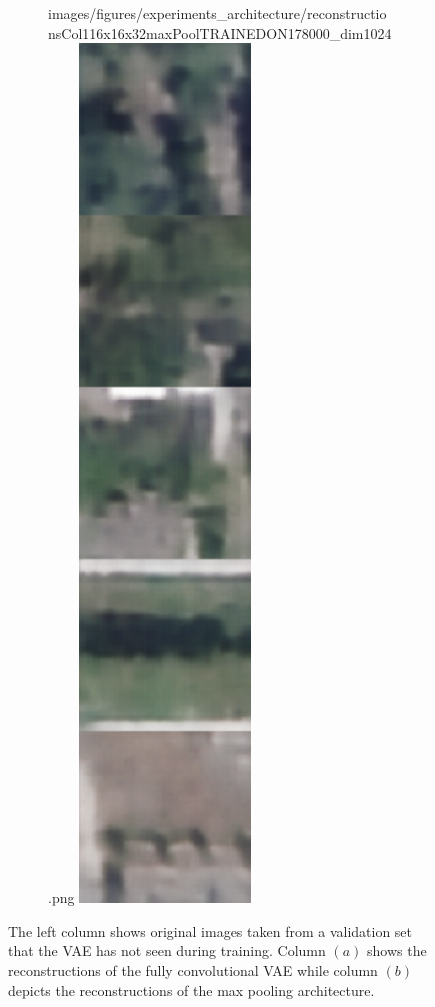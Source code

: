 \begin{figure}[H]
\begin{subfigure}[t]{.19\textwidth}
        {images/figures/experiments_architecture/reconstructionsCol116x16x32maxPoolTRAINEDON178000_dim1024.png}\hfill
        \includegraphics[width=0.5\textwidth]
        {images/figures/experiments_architecture/reconstructionsCol216x16x32maxPoolTRAINEDON178000_dim1024.png}
        \caption{}
    \end{subfigure}
    \caption{The left column shows original images taken from a validation set that the VAE has not seen during
    training. Column $(a)$ shows the reconstructions of the fully convolutional VAE while column $(b)$ 
    depicts the reconstructions of the max pooling architecture.}
\end{figure} \label{figure_results_trained_on_all}


